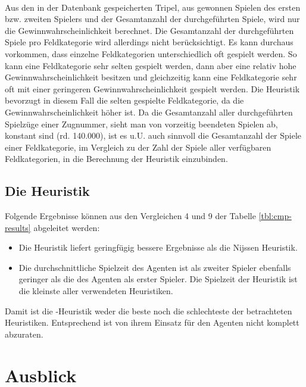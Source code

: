 \vspace{0.5cm}
\\Aus den in der Datenbank gespeicherten Tripel, aus gewonnen Spielen des ersten bzw. zweiten Spielers und der Gesamtanzahl der durchgeführten Spiele, wird nur die Gewinnwahrscheinlichkeit berechnet. Die Gesamtanzahl der durchgeführten Spiele pro Feldkategorie wird allerdings nicht berücksichtigt. Es kann durchaus vorkommen, dass einzelne Feldkategorien unterschiedlich oft gespielt werden. So kann eine Feldkategorie sehr selten gespielt werden, dann aber eine relativ hohe Gewinnwahrscheinlichkeit besitzen und gleichzeitig kann eine Feldkategorie sehr oft mit einer geringeren Gewinnwahrscheinlichkeit gespielt werden. Die Heuristik bevorzugt in diesem Fall die selten gespielte Feldkategorie, da die Gewinnwahrscheinlichkeit höher ist. Da die Gesamtanzahl aller durchgeführten Spielzüge einer Zugnummer, sieht man von vorzeitig beendeten Spielen ab, konstant sind (rd. 140.000), ist es u.U. auch sinnvoll die Gesamtanzahl der Spiele einer Feldkategorie, im Vergleich zu der Zahl der Spiele aller verfügbaren Feldkategorien, in die Berechnung der Heuristik einzubinden.

\subsection{Die Heuristik }
Folgende Ergebnisse können aus den Vergleichen 4 und 9 der Tabelle \ref{tbl:cmp-results} abgeleitet werden:
\begin{itemize}
\item Die Heuristik liefert geringfügig bessere Ergebnisse als die Nijssen Heuristik.
\item Die durchschnittliche Spielzeit des Agenten ist als zweiter Spieler ebenfalls geringer als die des Agenten als erster Spieler. Die Spielzeit der  Heuristik ist die kleinste aller verwendeten Heuristiken.
\end{itemize}
Damit ist die -Heuristik weder die beste noch die schlechteste der betrachteten Heuristiken. Entsprechend ist von ihrem Einsatz für den Agenten \mxZitat{\abp} nicht komplett abzuraten.

\section{Ausblick}
